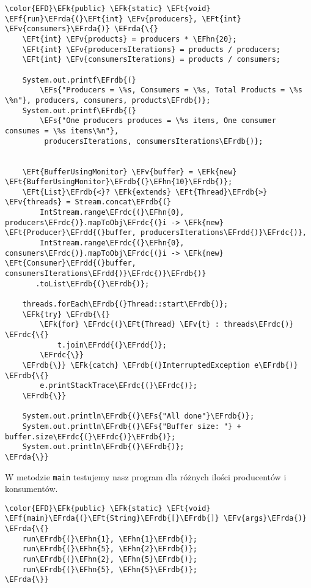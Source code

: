 \documentclass[11pt]{article}
\newcommand{\EFs}[1]{\textcolor{EFs}{#1}} %
\newcommand{\EFk}[1]{\textcolor{EFk}{#1}} %
\newcommand{\EFf}[1]{\textcolor{EFf}{#1}} %
\newcommand{\EFv}[1]{\textcolor{EFv}{#1}} %
\newcommand{\EFt}[1]{\textcolor{EFt}{#1}} %
\newcommand{\EFhn}[1]{\textcolor{EFhn}{#1}} %
\newcommand{\EFrda}[1]{#1} %
\newcommand{\EFrdb}[1]{\textcolor{EFrdb}{#1}} %
\newcommand{\EFrdc}[1]{\textcolor{EFrdc}{#1}} %
\newcommand{\EFrdd}[1]{\textcolor{EFrdd}{#1}} %
\begin{document}
\begin{Code}
\begin{Verbatim}
\color{EFD}\EFk{public} \EFk{static} \EFt{void} \EFf{run}\EFrda{(}\EFt{int} \EFv{producers}, \EFt{int} \EFv{consumers}\EFrda{)} \EFrda{\{}
    \EFt{int} \EFv{products} = producers * \EFhn{20};
    \EFt{int} \EFv{producersIterations} = products / producers;
    \EFt{int} \EFv{consumersIterations} = products / consumers;

    System.out.printf\EFrdb{(}
        \EFs{"Producers = \%s, Consumers = \%s, Total Products = \%s \%n"}, producers, consumers, products\EFrdb{)};
    System.out.printf\EFrdb{(}
        \EFs{"One producers produces = \%s items, One consumer consumes = \%s items\%n"},
         producersIterations, consumersIterations\EFrdb{)};


    \EFt{BufferUsingMonitor} \EFv{buffer} = \EFk{new} \EFt{BufferUsingMonitor}\EFrdb{(}\EFhn{10}\EFrdb{)};
    \EFt{List}\EFrdb{<}? \EFk{extends} \EFt{Thread}\EFrdb{>} \EFv{threads} = Stream.concat\EFrdb{(}
        IntStream.range\EFrdc{(}\EFhn{0}, producers\EFrdc{)}.mapToObj\EFrdc{(}i -> \EFk{new} \EFt{Producer}\EFrdd{(}buffer, producersIterations\EFrdd{)}\EFrdc{)},
        IntStream.range\EFrdc{(}\EFhn{0}, consumers\EFrdc{)}.mapToObj\EFrdc{(}i -> \EFk{new} \EFt{Consumer}\EFrdd{(}buffer, consumersIterations\EFrdd{)}\EFrdc{)}\EFrdb{)}
       .toList\EFrdb{(}\EFrdb{)};

    threads.forEach\EFrdb{(}Thread::start\EFrdb{)};
    \EFk{try} \EFrdb{\{}
        \EFk{for} \EFrdc{(}\EFt{Thread} \EFv{t} : threads\EFrdc{)} \EFrdc{\{}
            t.join\EFrdd{(}\EFrdd{)};
        \EFrdc{\}}
    \EFrdb{\}} \EFk{catch} \EFrdb{(}InterruptedException e\EFrdb{)} \EFrdb{\{}
        e.printStackTrace\EFrdc{(}\EFrdc{)};
    \EFrdb{\}}

    System.out.println\EFrdb{(}\EFs{"All done"}\EFrdb{)};
    System.out.println\EFrdb{(}\EFs{"Buffer size: "} + buffer.size\EFrdc{(}\EFrdc{)}\EFrdb{)};
    System.out.println\EFrdb{(}\EFrdb{)};
\EFrda{\}}
\end{Verbatim}
\end{Code}

W metodzie \texttt{main} testujemy nasz program dla różnych ilości producentów i konsumentów.
\begin{Code}
\begin{Verbatim}
\color{EFD}\EFk{public} \EFk{static} \EFt{void} \EFf{main}\EFrda{(}\EFt{String}\EFrdb{[}\EFrdb{]} \EFv{args}\EFrda{)} \EFrda{\{}
    run\EFrdb{(}\EFhn{1}, \EFhn{1}\EFrdb{)};
    run\EFrdb{(}\EFhn{5}, \EFhn{2}\EFrdb{)};
    run\EFrdb{(}\EFhn{2}, \EFhn{5}\EFrdb{)};
    run\EFrdb{(}\EFhn{5}, \EFhn{5}\EFrdb{)};
\EFrda{\}}
\end{Verbatim}
\end{Code}
\end{document}
